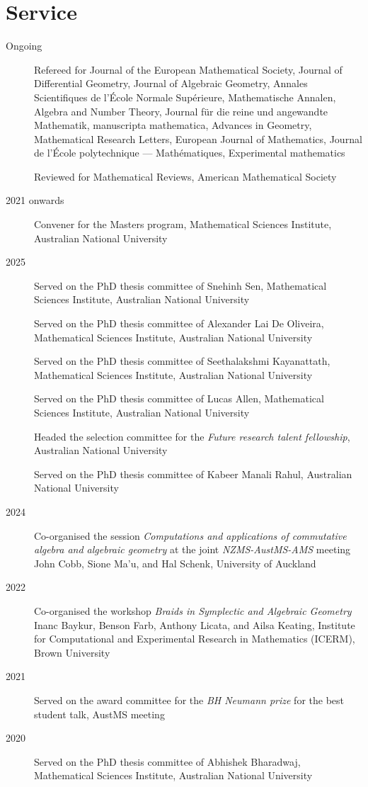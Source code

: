\documentclass[11pt]{article}
\begin{document}
\section*{Service}
\label{sec:org37fc4f5}

\label{orge6d0e8e}
\begin{description}
\item[{Ongoing}] Refereed for Journal of the European Mathematical Society, Journal of Differential Geometry, Journal of Algebraic Geometry, Annales Scientifiques de l'École Normale Supérieure, Mathematische Annalen, Algebra and Number Theory, Journal für die reine und angewandte Mathematik, manuscripta mathematica, Advances in Geometry, Mathematical Research Letters, European Journal of Mathematics, Journal de l'École polytechnique — Mathématiques, Experimental mathematics

Reviewed for Mathematical Reviews, American Mathematical Society
\item[{2021 onwards}] Convener for the Masters program, Mathematical Sciences Institute, Australian National University
\item[{2025}] Served on the PhD thesis committee of Snehinh Sen, Mathematical Sciences Institute, Australian National University

Served on the PhD thesis committee of Alexander Lai De Oliveira, Mathematical Sciences Institute, Australian National University

Served on the PhD thesis committee of Seethalakshmi Kayanattath, Mathematical Sciences Institute, Australian National University

Served on the PhD thesis committee of Lucas Allen, Mathematical Sciences Institute, Australian National University

Headed the selection committee for the \emph{Future research talent fellowship}, Australian National University

Served on the PhD thesis committee of Kabeer Manali Rahul, Australian National University
\item[{2024}] Co-organised the session \emph{Computations and applications of commutative algebra and algebraic geometry} at the joint \emph{NZMS-AustMS-AMS} meeting John Cobb, Sione Ma'u, and Hal Schenk, University of Auckland
\item[{2022}] Co-organised the workshop \emph{Braids in Symplectic and Algebraic Geometry} Inanc Baykur, Benson Farb, Anthony Licata, and Ailsa Keating, Institute for Computational and Experimental Research in Mathematics (ICERM), Brown University
\item[{2021}] Served on the award committee for the \emph{BH Neumann prize} for the best student talk, AustMS meeting
\item[{2020}] Served on the PhD thesis committee of Abhishek Bharadwaj, Mathematical Sciences Institute, Australian National University


\end{description}
\end{document}
